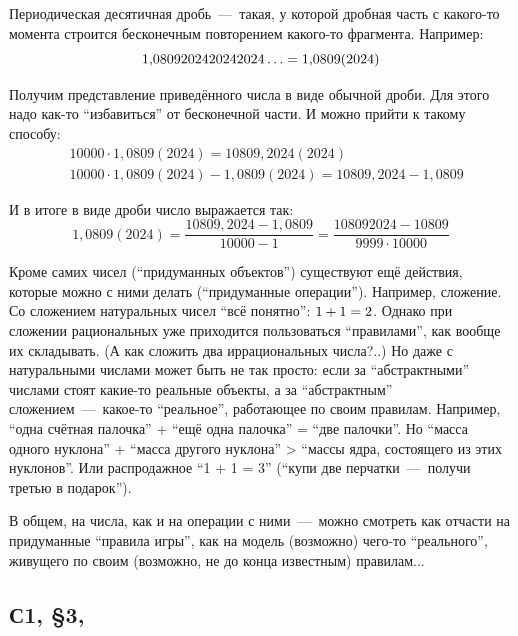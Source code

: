 \documentclass[a4paper,12pt]{article}
\begin{document}
  \begin{example}
    Периодическая десятичная дробь~---~такая, у которой дробная часть с какого-то момента строится бесконечным повторением какого-то фрагмента.
    Например:
    \[
      1{,}0809202420242024\ldots \hm= 1{,}0809(2024)
    \]
    
    Получим представление приведённого числа в виде обычной дроби.
    Для этого надо как-то ``избавиться'' от бесконечной части.
    И можно прийти к такому способу:
    \[
      \begin{aligned}
        &10000 \cdot 1{,}0809(2024) = 10809{,}2024(2024)\\
        &10000 \cdot 1{,}0809(2024) - 1{,}0809(2024) = 10809{,}2024 - 1{,}0809
      \end{aligned}
    \]
    
    И в итоге в виде дроби число выражается так:
    \[
      1{,}0809(2024) = \frac{10809{,}2024 - 1{,}0809}{10000 - 1} = \frac{108092024 - 10809}{9999 \cdot 10000}
    \]
  \end{example}
  
  
  Кроме самих чисел (``придуманных объектов'') существуют ещё действия, которые можно с ними делать (``придуманные операции'').
  Например, сложение.
  Со сложением натуральных чисел ``всё понятно'': $1 \hm+ 1 \hm= 2$.
  Однако при сложении рациональных уже приходится пользоваться ``правилами'', как вообще их складывать.
  (А как сложить два иррациональных числа?..)
  Но даже с натуральными числами может быть не так просто: если за ``абстрактными'' числами стоят какие-то реальные объекты, а за ``абстрактным'' сложением~---~какое-то ``реальное'', работающее по своим правилам.
  Например, ``одна счётная палочка'' + ``ещё одна палочка'' = ``две палочки''.
  Но ``масса одного нуклона'' + ``масса другого нуклона'' > ``массы ядра, состоящего из этих нуклонов''.
  Или распродажное ``1 + 1 = 3'' (``купи две перчатки~---~получи третью в подарок'').
  
  В общем, на числа, как и на операции с ними~---~можно смотреть как отчасти на придуманные ``правила игры'', как на модель (возможно) чего-то ``реального'', живущего по своим (возможно, не до конца известным) правилам...
  
  \newpage
  
  
  \subsection{С1, \S 3, }
  
\end{document}
